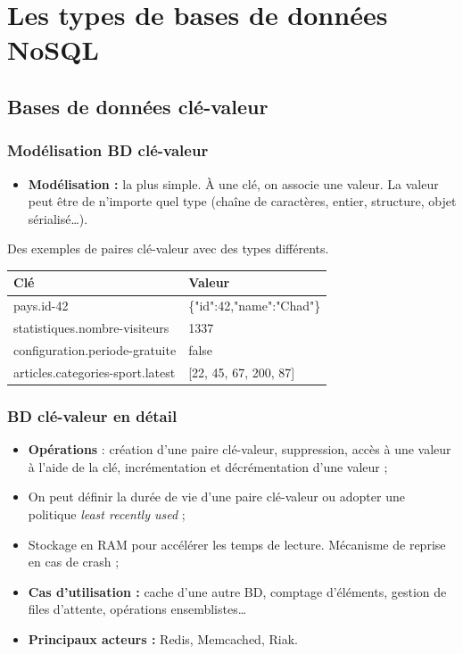 \section{Les types de bases de données NoSQL}

	\subsection{Bases de données clé-valeur}
	\begin{frame}
		\frametitle{Modélisation BD clé-valeur}

		\begin{itemize}
			\item \textbf{Modélisation :} la plus simple. À une clé, on associe une valeur. La valeur peut être de n'importe quel type (chaîne de caractères, entier, structure, objet sérialisé\dots).
		\end{itemize}

		\vspace{15px}
		Des exemples de paires clé-valeur avec des types différents.
		\vspace{5px}
		\begin{tabular}{|l|l|}
			\hline
			\textbf{Clé} & \textbf{Valeur} \\ \hline\hline
			pays.id-42 & \{"id":42,"name":"Chad"\} \\ \hline
			statistiques.nombre-visiteurs & 1337 \\ \hline
			configuration.periode-gratuite & false \\ \hline
			articles.categories-sport.latest & [22, 45, 67, 200, 87] \\ \hline
		\end{tabular}
	\end{frame}

	\begin{frame}
		\frametitle{BD clé-valeur en détail}
		\begin{itemize}
			\item \textbf{Opérations} : création d'une paire clé-valeur, suppression, accès à une valeur à l'aide de la clé, incrémentation et décrémentation d'une valeur ;
			\item On peut définir la durée de vie d'une paire clé-valeur ou adopter une politique \textit{least recently used} ;
			\item Stockage en RAM pour accélérer les temps de lecture. Mécanisme de reprise en cas de crash ;
			\item \textbf{Cas d'utilisation :} cache d'une autre BD, comptage d'éléments, gestion de files d'attente, opérations ensemblistes\dots
			\item \textbf{Principaux acteurs :} Redis, Memcached, Riak.
		\end{itemize}
	\end{frame}

